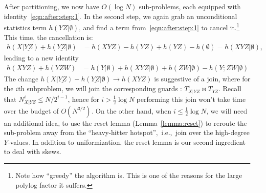 \documentclass{theoretics}
\begin{document}
After partitioning, we now have $O(\log N)$ sub-problems, each equipped with
identity~\eqref{eqn:after:step:1}. In the second step, we again grab an unconditional
statistics term $h(YZ|\emptyset)$, and find a term from~\eqref{eqn:after:step:1} to
cancel it.\footnote{Note how ``greedy'' the algorithm is. This is one of the reasons for the
large polylog factor it suffers.} This time, the cancellation is:
%
\begin{align*}
  h(X|\underline{YZ})+h(\underline{YZ}|\emptyset) &=
  h(XYZ)-h(YZ)+h(YZ)-h(\emptyset) =h(XYZ|\emptyset),
\end{align*}
%
leading to a new identity
%
\begin{align} \label{eqn:after:step:2}
  h(XYZ)+h(YZW) &= h(Y|\emptyset)+h(XYZ|\emptyset) + h(ZW|\emptyset)- h(Y;ZW|\emptyset)
\end{align}
%
The change $h(X|\underline{YZ})+h(\underline{YZ}|\emptyset) \to h(XYZ)$ is suggestive of a
join, where for the $i$th subproblem, we will join the corresponding guards : $T^i_{X|YZ}
\Join T_{YZ}$. Recall that $N^i_{X|YZ} \leq N/2^{i-1}$, hence for $i > \frac 1 2 \log N$
performing this join won't take time over the budget of $O(N^{3/2})$. On the other hand,
when $i \leq \frac 1 2 \log N$, we will need an additional idea, to use the reset lemma
(Lemma~\ref{lemma:reset}) to reroute the sub-problem away from the ``heavy-hitter hotspot'',~i.e.,~join over the high-degree $Y$-values. In
addition to uniformization, the reset lemma is our second ingredient to deal with skews.
\end{document}
